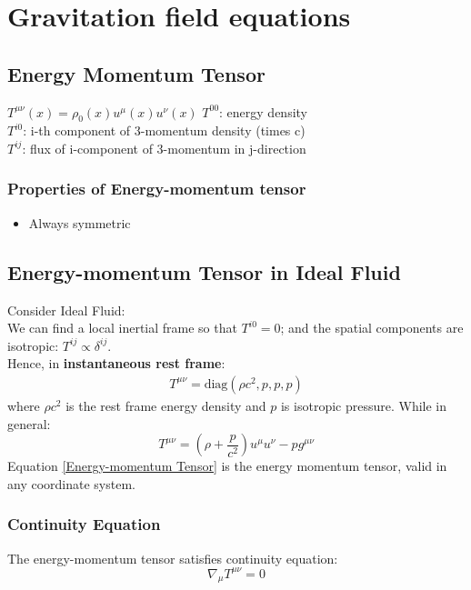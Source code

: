 \documentclass[12pt,a4paper]{article}
\begin{document}
\section{Gravitation field equations}
    \subsection{Energy Momentum Tensor}
        {$T^{\mu\nu}(x)=\rho_0(x) u^\mu(x) u^\nu(x)$}
        {
        $T^{00}$: energy density\\
        $T^{i0}$: i-th component of 3-momentum density (times c)\\
        $T^{ij}$: flux of i-component of 3-momentum in j-direction
        }
    \subsubsection{Properties of Energy-momentum tensor}
    \begin{itemize}
        \item Always symmetric
    \end{itemize}
    \subsection{Energy-momentum Tensor in Ideal Fluid}
        Consider Ideal Fluid:\\
        We can find a local inertial frame so that $T^{i0}=0$; and the spatial components are isotropic: $T^{ij}\propto\delta^{ij}$.\\
        Hence, in \textbf{instantaneous rest frame}:
        \begin{align*}
            T^{\mu\nu}= \text{diag}(\rho c^2,p,p,p)
        \end{align*}
        where $\rho c^2$ is the rest frame energy density and $p$ is isotropic pressure.
        While in general:
        \begin{equation}\label{Energy-momentum Tensor}
            T^{\mu\nu}= (\rho+\dfrac{p}{c^2})u^\mu u^\nu - pg^{\mu\nu}
        \end{equation}
        Equation \ref{Energy-momentum Tensor} is the energy momentum tensor, valid in any coordinate system.\\
        \subsubsection{Continuity Equation}
        The energy-momentum tensor satisfies continuity equation:
        \begin{equation*}
            \nabla_\mu T^{\mu\nu} = 0
        \end{equation*}
\end{document}
